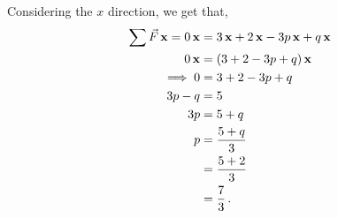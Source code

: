 \begin{subquestions}
Considering the $x$ direction, we get that,
\begin{align}
	\sum\vec{F}\,\mathbf{x} = 0\,\mathbf{x} & = 3\,\mathbf{x} + 2\,\mathbf{x} -3p\,\mathbf{x} +q\,\mathbf{x} \nonumber \\
	                   0\,\mathbf{x} & = (3+2-3p+q)\,\mathbf{x} \nonumber \\
	\implies 0 & = 3+2-3p+q \nonumber \\
			 3p-q & = 5 \nonumber \\
	           3p & = 5+q \nonumber \\
	            p & = \frac{5+q}{3} \nonumber \\
	              & = \frac{5+2}{3} \nonumber \\
	              & = \frac{7}{3} \,.
\end{align}


\end{subquestions}